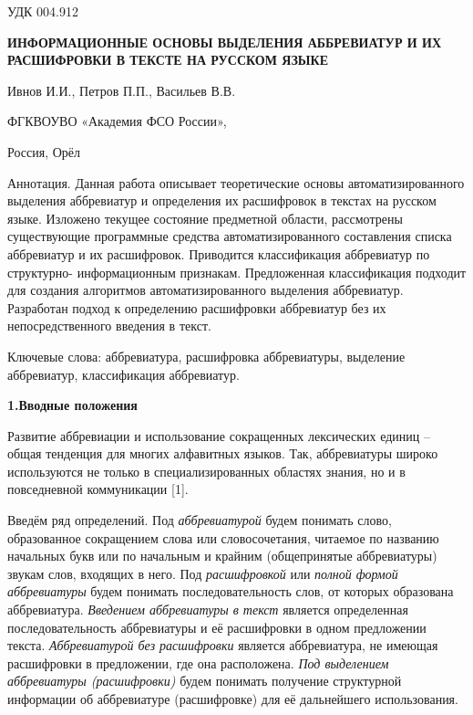 \documentclass[fleqn, a4paper,12pt]{article}
\begin{document}
\begin{flushleft}
УДК 004.912
\end{flushleft}
\vspace{-0.5cm}
\begin{center}
\normalsize
\textbf{ИНФОРМАЦИОННЫЕ ОСНОВЫ ВЫДЕЛЕНИЯ АББРЕВИАТУР И ИХ РАСШИФРОВКИ В ТЕКСТЕ НА РУССКОМ ЯЗЫКЕ}
\end{center}
\vspace{-1cm}
\begin{center}
Ивнов И.И., Петров П.П., Васильев В.В.
\end{center}
\vspace{-1 cm}
\begin{center}
ФГКВОУВО «Академия ФСО России»,
\end{center}
\vspace{-1 cm}
\begin{center}
Россия, Орёл
\end{center}
\vspace{0.5cm}

Аннотация. Данная работа описывает теоретические основы автоматизированного выделения аббревиатур и определения их расшифровок в текстах на русском языке. Изложено текущее состояние предметной области, рассмотрены существующие программные средства автоматизированного составления списка аббревиатур и их расшифровок. Приводится классификация аббревиатур по структурно- информационным признакам. Предложенная классификация подходит для создания алгоритмов автоматизированного выделения аббревиатур. Разработан подход к определению расшифровки аббревиатур без их непосредственного введения в текст.

Ключевые слова: аббревиатура, расшифровка аббревиатуры, выделение аббревиатур, классификация аббревиатур.

\vspace{0.5cm}
\textbf {1.Вводные положения}

Развитие аббревиации и использование сокращенных лексических единиц – общая тенденция для многих алфавитных языков. Так, аббревиатуры широко используются не только в специализированных областях знания, но и в повседневной коммуникации [1]. 

Введём ряд определений. Под \textit{аббревиатурой} будем понимать слово, образованное сокращением слова или словосочетания, читаемое по названию начальных букв или по начальным и крайним (общепринятые аббревиатуры) звукам слов, входящих в него. Под \textit{расшифровкой} или \textit{полной формой аббревиатуры} будем понимать последовательность слов, от которых образована аббревиатура. \textit{Введением аббревиатуры в текст} является определенная последовательность аббревиатуры и её расшифровки в одном предложении текста. \textit{Аббревиатурой без расшифровки} является аббревиатура, не имеющая расшифровки в предложении, где она расположена. \textit{Под выделением аббревиатуры (расшифровки)} будем понимать получение структурной информации об аббревиатуре (расшифровке) для её дальнейшего использования.
\end{document}
